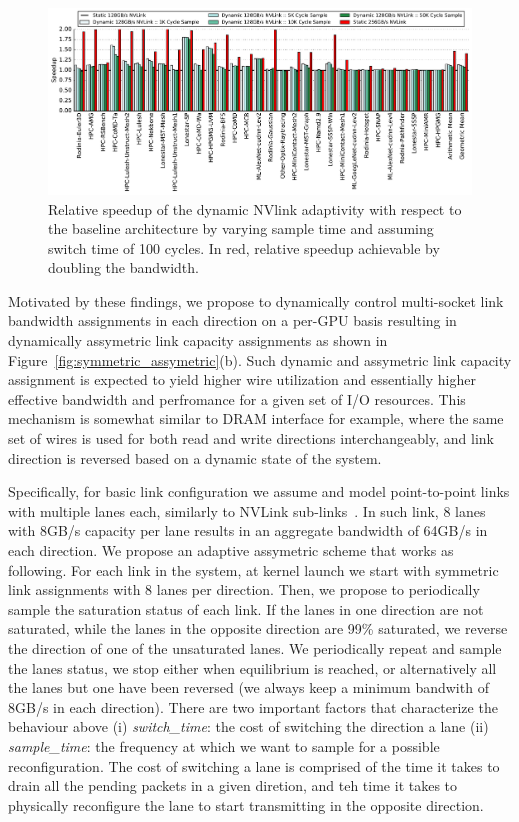 \begin{figure}[tp]
    \centering
    \includegraphics[width=1.0\textwidth]{figures/plot_nvlink_sample_time.pdf}
    \caption{Relative speedup of the dynamic NVlink adaptivity with respect to
	the baseline architecture by varying sample time and assuming switch time of
	100 cycles. In red, relative speedup achievable by doubling the bandwidth.}
    \label{fig:sampletime}
\end{figure}

Motivated by these findings, we propose to dynamically control multi-socket
link bandwidth assignments in each direction on a per-GPU basis resulting in
dynamically assymetric link capacity assignments as shown in
Figure~\ref{fig:symmetric_assymetric}(b). Such dynamic and assymetric link
capacity assignment is expected to yield higher wire utilization and
essentially higher effective bandwidth and perfromance for a given set of I/O
resources. This mechanism is somewhat similar to DRAM interface for example,
where the same set of wires is used for both read and write directions
interchangeably, and link direction is reversed based on a dynamic state of the
system. 

Specifically, for basic link configuration we assume and model point-to-point
links with multiple lanes each, similarly to NVLink
sub-links~\cite{pascal-tesla-wp}.  In such link, 8 lanes with 8GB/s capacity
per lane results in an aggregate bandwidth of 64GB/s in each direction. We
propose an adaptive assymetric scheme that works as following. For each link
in the system, at kernel launch we start with symmetric link assignments with 8
lanes per direction. Then, we propose to periodically sample the saturation
status of each link. If the lanes in one direction are not saturated, while the
lanes in the opposite direction are 99\% saturated, we reverse the direction of
one of the unsaturated lanes. We periodically repeat and sample the lanes
status, we stop either when equilibrium is reached, or alternatively all the lanes but one
have been reversed (we always keep a minimum bandwith of 8GB/s in each
direction).  
There are two important factors that characterize the
behaviour above (i) \emph{switch\_time}: the cost of switching the direction a
lane (ii) \emph{sample\_time}: the frequency at which we want to sample for a
possible reconfiguration. The cost of switching a lane is comprised of the time
it takes to drain all the pending packets in a given diretion, and teh time it
takes to physically reconfigure the lane to start transmitting in the opposite
direction.

